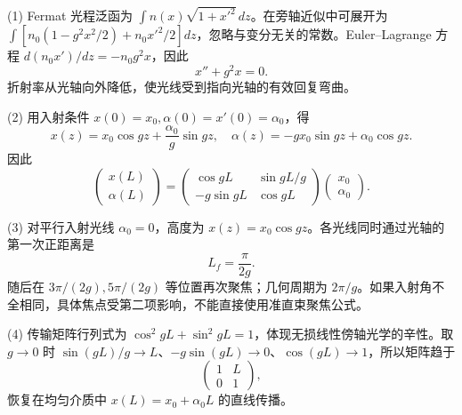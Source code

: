 (1) Fermat 光程泛函为 \(\int n(x)\sqrt{1+x'^2}\,dz\)。在旁轴近似中可展开为 \(\int[n_0(1-g^2x^2/2)+n_0x'^2/2]dz\)，忽略与变分无关的常数。Euler–Lagrange 方程 \(d(n_0x')/dz=-n_0g^2x\)，因此
\[
x''+g^2x=0.
\]
折射率从光轴向外降低，使光线受到指向光轴的有效回复弯曲。

(2) 用入射条件 \(x(0)=x_0,\alpha(0)=x'(0)=\alpha_0\)，得
\[
x(z)=x_0\cos gz+\frac{\alpha_0}{g}\sin gz,\quad
\alpha(z)=-gx_0\sin gz+\alpha_0\cos gz.
\]
因此
\[
\begin{pmatrix}x(L)\\\alpha(L)\end{pmatrix}
=\begin{pmatrix}\cos gL&\sin gL/g\\-g\sin gL&\cos gL\end{pmatrix}
\begin{pmatrix}x_0\\\alpha_0\end{pmatrix}.
\]

(3) 对平行入射光线 \(\alpha_0=0\)，高度为 \(x(z)=x_0\cos gz\)。各光线同时通过光轴的第一次正距离是
\[
L_f=\frac{\pi}{2g}.
\]
随后在 \(3\pi/(2g),5\pi/(2g)\) 等位置再次聚焦；几何周期为 \(2\pi/g\)。如果入射角不全相同，具体焦点受第二项影响，不能直接使用准直束聚焦公式。

(4) 传输矩阵行列式为 \(\cos^2gL+\sin^2gL=1\)，体现无损线性傍轴光学的辛性。取 \(g\to 0\) 时 \(\sin(gL)/g\to L\)、\(-g\sin(gL)\to0\)、\(\cos(gL)\to1\)，所以矩阵趋于
\[
\begin{pmatrix}1&L\\0&1\end{pmatrix},
\]
恢复在均匀介质中 \(x(L)=x_0+\alpha_0L\) 的直线传播。
